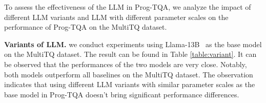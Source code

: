\documentclass[10pt, a4paper]{article}
\begin{document}
\begin{table}[ht]
    \centering
 \caption{
 Performance of Prog-TQA with different LLM variants. }
    \label{table:variant}
\end{table}
\begin{table}[ht]
    \centering
 \caption{
 Performance of Prog-TQA with different scales of LLM. Due to cost constraints, experiments were conducted on randomly selected 5 subsets of size 2000 from MultiTQ, with average results being reported.}
    \label{table:vicuna-size}
\end{table}

To assess the effectiveness of the LLM in Prog-TQA, we analyze the impact of different LLM variants and LLM with different parameter scales on the performance of Prog-TQA on the MultiTQ dataset.

\textbf{Variants of LLM.} 
we conduct experiments using Llama-13B~\cite{touvron2023llama} as the base model on the MultiTQ dataset. The result can be found in Table \ref{table:variant}. It can be observed that the performances of the two models are very close. Notably, both models outperform all baselines on the MultiTQ dataset. The observation indicates that using different LLM variants with similar parameter scales as the base model in Prog-TQA doesn’t bring significant performance differences. 
\end{document}
